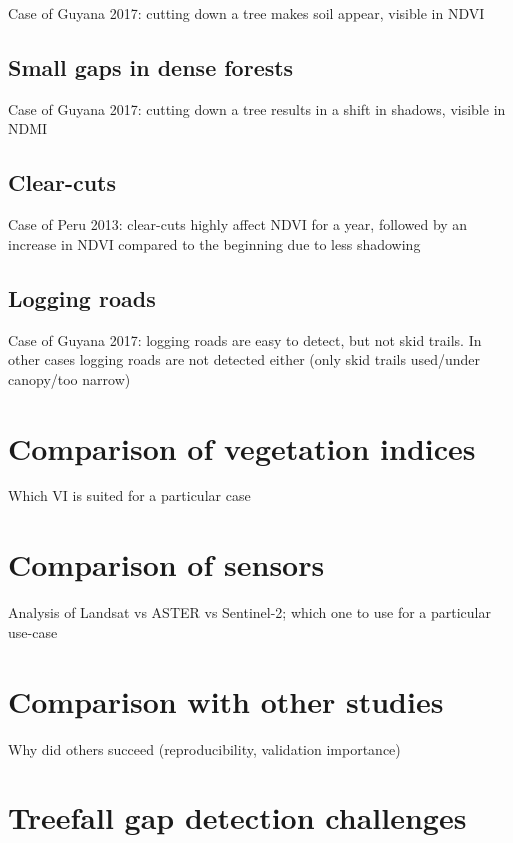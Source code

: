 \documentclass[a4paper,12pt]{scrbook}
\begin{document}
Case of Guyana 2017: cutting down a tree makes soil appear, visible in \ac{NDVI}

\subsection{Small gaps in dense forests}

Case of Guyana 2017: cutting down a tree results in a shift in shadows, visible in \ac{NDMI}

\subsection{Clear-cuts}

Case of Peru 2013: clear-cuts highly affect \ac{NDVI} for a year, followed by an increase in \ac{NDVI} compared to the beginning due to less shadowing

\subsection{Logging roads}

Case of Guyana 2017: logging roads are easy to detect, but not skid trails. In other cases logging roads are not detected either (only skid trails used/under canopy/too narrow)

\section{Comparison of vegetation indices}

Which VI is suited for a particular case

\section{Comparison of sensors}

Analysis of Landsat vs ASTER vs Sentinel-2; which one to use for a particular use-case

\section{Comparison with other studies}

Why did others succeed (reproducibility, validation importance)

\section{Treefall gap detection challenges}
\end{document}
